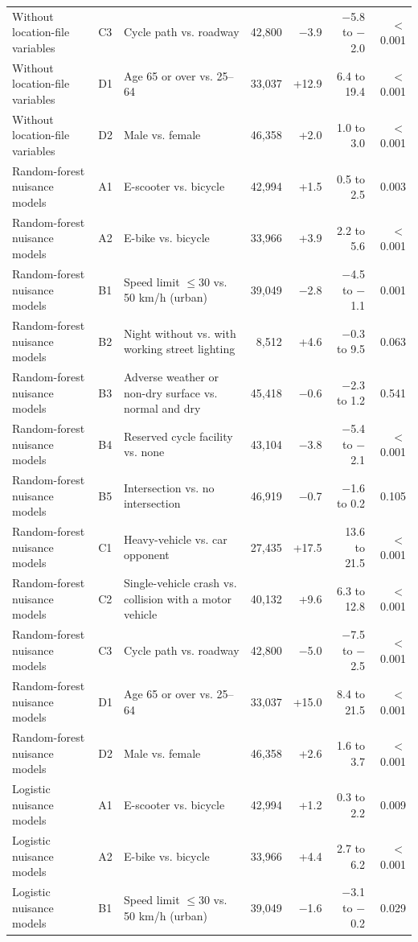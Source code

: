 \begin{table}[tp]
\begin{threeparttable}
{\begin{tabular}{p{4.6cm}lp{4.4cm}rrrr}
Without location-file variables & C3 & Cycle path vs. roadway & 42,800 & $-$3.9 & $-$5.8 to $-$2.0 & $<$0.001 \\
Without location-file variables & D1 & Age 65 or over vs. 25–64 & 33,037 & +12.9 & 6.4 to 19.4 & $<$0.001 \\
Without location-file variables & D2 & Male vs. female & 46,358 & +2.0 & 1.0 to 3.0 & $<$0.001 \\
Random-forest nuisance models & A1 & E-scooter vs. bicycle & 42,994 & +1.5 & 0.5 to 2.5 & 0.003 \\
Random-forest nuisance models & A2 & E-bike vs. bicycle & 33,966 & +3.9 & 2.2 to 5.6 & $<$0.001 \\
Random-forest nuisance models & B1 & Speed limit $\leq$30 vs. 50 km/h (urban) & 39,049 & $-$2.8 & $-$4.5 to $-$1.1 & 0.001 \\
Random-forest nuisance models & B2 & Night without vs. with working street lighting & 8,512 & +4.6 & $-$0.3 to 9.5 & 0.063 \\
Random-forest nuisance models & B3 & Adverse weather or non-dry surface vs. normal and dry & 45,418 & $-$0.6 & $-$2.3 to 1.2 & 0.541 \\
Random-forest nuisance models & B4 & Reserved cycle facility vs. none & 43,104 & $-$3.8 & $-$5.4 to $-$2.1 & $<$0.001 \\
Random-forest nuisance models & B5 & Intersection vs. no intersection & 46,919 & $-$0.7 & $-$1.6 to 0.2 & 0.105 \\
Random-forest nuisance models & C1 & Heavy-vehicle vs. car opponent & 27,435 & +17.5 & 13.6 to 21.5 & $<$0.001 \\
Random-forest nuisance models & C2 & Single-vehicle crash vs. collision with a motor vehicle & 40,132 & +9.6 & 6.3 to 12.8 & $<$0.001 \\
Random-forest nuisance models & C3 & Cycle path vs. roadway & 42,800 & $-$5.0 & $-$7.5 to $-$2.5 & $<$0.001 \\
Random-forest nuisance models & D1 & Age 65 or over vs. 25–64 & 33,037 & +15.0 & 8.4 to 21.5 & $<$0.001 \\
Random-forest nuisance models & D2 & Male vs. female & 46,358 & +2.6 & 1.6 to 3.7 & $<$0.001 \\
Logistic nuisance models & A1 & E-scooter vs. bicycle & 42,994 & +1.2 & 0.3 to 2.2 & 0.009 \\
Logistic nuisance models & A2 & E-bike vs. bicycle & 33,966 & +4.4 & 2.7 to 6.2 & $<$0.001 \\
Logistic nuisance models & B1 & Speed limit $\leq$30 vs. 50 km/h (urban) & 39,049 & $-$1.6 & $-$3.1 to $-$0.2 & 0.029 \\

\end{tabular}}
\end{threeparttable}
\end{table}
